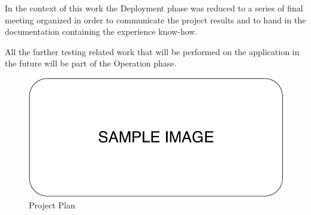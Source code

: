 In the context of this work the Deployment phase was reduced to a series of final meeting organized in order to communicate the project results and to hand in the documentation containing the experience know-how.

All the further testing related work that will be performed on the application in the future will be part of the Operation phase.

\begin{figure}[ht]
	\centering
	\includegraphics[scale=0.7]{Images/SampleImage.pdf}
	\caption{Project Plan}
	\label{fig:projectPlan}
\end{figure}